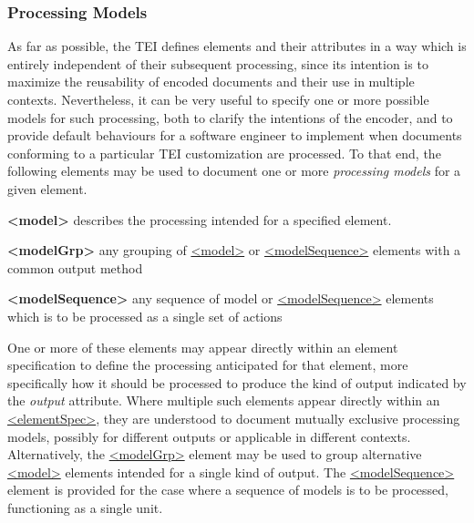 \subsubsection[{Processing Models}]{Processing Models}\label{TDPM}\par
As far as possible, the TEI defines elements and their attributes in a way which is entirely independent of their subsequent processing, since its intention is to maximize the reusability of encoded documents and their use in multiple contexts. Nevertheless, it can be very useful to specify one or more possible models for such processing, both to clarify the intentions of the encoder, and to provide default behaviours for a software engineer to implement when documents conforming to a particular TEI customization are processed. To that end, the following elements may be used to document one or more \textit{processing models} for a given element. 
\begin{sansreflist}
  
\item [\textbf{<model>}] describes the processing intended for a specified element.
\item [\textbf{<modelGrp>}] any grouping of \hyperref[TEI.model]{<model>} or \hyperref[TEI.modelSequence]{<modelSequence>} elements with a common output method
\item [\textbf{<modelSequence>}] any sequence of model or \hyperref[TEI.modelSequence]{<modelSequence>} elements which is to be processed as a single set of actions
\end{sansreflist}
\par
One or more of these elements may appear directly within an element specification to define the processing anticipated for that element, more specifically how it should be processed to produce the kind of output indicated by the {\itshape output} attribute. Where multiple such elements appear directly within an \hyperref[TEI.elementSpec]{<elementSpec>}, they are understood to document mutually exclusive processing models, possibly for different outputs or applicable in different contexts. Alternatively, the \hyperref[TEI.modelGrp]{<modelGrp>} element may be used to group alternative \hyperref[TEI.model]{<model>} elements intended for a single kind of output. The \hyperref[TEI.modelSequence]{<modelSequence>} element is provided for the case where a sequence of models is to be processed, functioning as a single unit.\par
